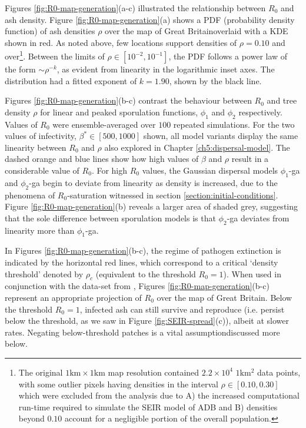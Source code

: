 
Figures \ref{fig:R0-map-generation}(a-c) illustrated the relationship between $R_0$ and ash density.
Figure \ref{fig:R0-map-generation}(a) shows a PDF (probability density function) of ash densities $\rho$ over the map of Great Britain\textemdash overlaid with a KDE shown in red.
As noted above, few locations support densities of $\rho=0.10$ and over\footnote{
The original $\mathrm{1km \times 1km}$ map resolution contained $2.2\times 10^4$ $1\mathrm{km^2}$ data points, 
with some outlier pixels having densities in the interval $\rho \in [0.10, 0.30]$ which were excluded from the analysis due to 
A) the increased computational run-time required to simulate the SEIR model of ADB  
and B) densities beyond $0.10$ account for a negligible portion of the overall population.}. 
Between the limits of $\rho \in [10^{-2}, 10^{-1}]$, the PDF follows a power law of the form $\sim \rho ^{-k}$, as evident from linearity in the logarithmic inset axes.
The distribution had a fitted exponent of $k=1.90$, shown by the black line.

Figures \ref{fig:R0-map-generation}(b-c) contrast the behaviour between $R_0$ and tree density $\rho$ for linear and peaked sporulation functions, $\phi_1$ and $\phi_2$ respectively.
Values of $R_0$ were ensemble-averaged over $100$ repeated simulations.
For the two values of infectivity, $\beta^*\in [500, 1000]$ shown, all model variants display the same linearity between $R_0$ and $\rho$ \textemdash also explored in Chapter \ref{ch5:dispersal-model}.
The dashed orange and blue lines show how high values of $\beta$ and $\rho$ result in a considerable value of $R_0$.
For high $R_0$ values, the Gaussian dispersal models $\phi_1$-ga and $\phi_2$-ga begin to deviate from linearity as density is increased,
due to the phenomena of $R_0$-saturation witnessed in section \ref{section:initial-conditions}.
Figure \ref{fig:R0-map-generation}(b) reveals a larger area of shaded grey, 
suggesting that the sole difference between sporulation models is that $\phi_2$-ga deviates from linearity more than $\phi_1$-ga.

In Figures \ref{fig:R0-map-generation}(b-c), the regime of pathogen extinction is indicated by the horizontal red lines, 
which correspond to a critical `density threshold' denoted by $\rho_c$ (equivalent to the threshold $R_0 = 1$).
When used in conjunction with the data-set from \cite{hill.data}, Figures \ref{fig:R0-map-generation}(b-c) represent an appropriate projection of $R_0$ over the map of Great Britain.
Below the threshold $R_0=1$, infected ash can still survive and reproduce (i.e. persist below the threshold, as we saw in Figure \ref{fig:SEIR-spread}(c)), albeit at slower rates.
Negating below-threshold patches is a vital assumption\textemdash discussed more below.

